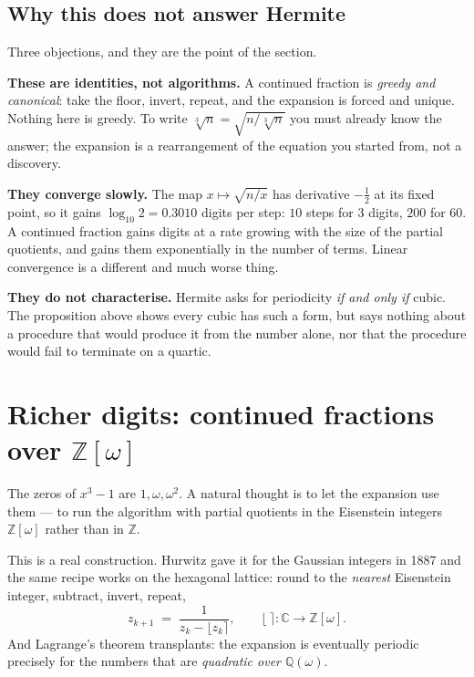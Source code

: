 \documentclass[12pt,a4paper]{article}
\theoremstyle{plain}
\theoremstyle{definition}
\begin{document}
\subsection*{Why this does not answer Hermite}

Three objections, and they are the point of the section.

\textbf{These are identities, not algorithms.} A continued fraction is \emph{greedy and canonical}: take the floor, invert, repeat, and the expansion is forced and unique. Nothing here is greedy. To write $\sqrt[3]{n} = \sqrt{n/\sqrt[3]{n}}$ you must already know the answer; the expansion is a rearrangement of the equation you started from, not a discovery.

\textbf{They converge slowly.} The map $x \mapsto \sqrt{n/x}$ has derivative $-\tfrac12$ at its fixed point, so it gains $\log_{10} 2 = 0.3010$ digits per step: $10$ steps for $3$ digits, $200$ for $60$. A continued fraction gains digits at a rate growing with the size of the partial quotients, and gains them exponentially in the number of terms. Linear convergence is a different and much worse thing.

\textbf{They do not characterise.} Hermite asks for periodicity \emph{if and only if} cubic. The proposition above shows every cubic has such a form, but says nothing about a procedure that would produce it from the number alone, nor that the procedure would fail to terminate on a quartic.

\section{Richer digits: continued fractions over $\mathbb{Z}[\omega]$}

The zeros of $x^3-1$ are $1, \omega, \omega^2$. A natural thought is to let the expansion use them --- to run the algorithm with partial quotients in the Eisenstein integers $\mathbb{Z}[\omega]$ rather than in $\mathbb{Z}$.

This is a real construction. Hurwitz gave it for the Gaussian integers in 1887 and the same recipe works on the hexagonal lattice: round to the \emph{nearest} Eisenstein integer, subtract, invert, repeat,
\[
  z_{k+1} \;=\; \frac{1}{z_k - \lfloor z_k \rceil}, \qquad \lfloor\ \rceil : \mathbb{C}\to\mathbb{Z}[\omega].
\]
And Lagrange's theorem transplants: the expansion is eventually periodic precisely for the numbers that are \emph{quadratic over $\mathbb{Q}(\omega)$}.
\end{document}
